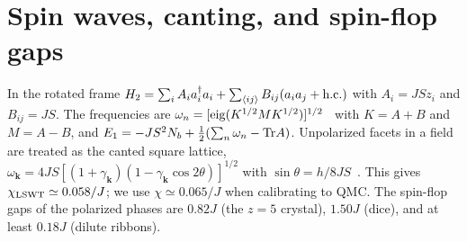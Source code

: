 \documentclass[aps,prb,twocolumn,superscriptaddress,floatfix]{revtex4-2}
\begin{document}
\section{Spin waves, canting, and spin-flop gaps}\label{app:sw}
In the rotated frame $H_2=\sum_iA_ia_i^\dagger a_i+\sum_{\langle ij\rangle}B_{ij}(a_ia_j+{\rm h.c.})$ with $A_i=JSz_i$ and $B_{ij}=JS$. The frequencies are $\omega_n=[{\rm eig}(K^{1/2}MK^{1/2})]^{1/2}$~\cite{Colpa1978} with $K=A+B$ and $M=A-B$, and $E_1=-JS^2N_b+\frac12(\sum_n\omega_n-{\rm Tr}A)$. Unpolarized facets in a field are treated as the canted square lattice, $\omega_{\mathbf k}=4JS[(1+\gamma_{\mathbf k})(1-\gamma_{\mathbf k}\cos2\theta)]^{1/2}$ with $\sin\theta=h/8JS$~\cite{Zhitomirsky1999}. This gives $\chi_{\rm LSWT}\simeq0.058/J$; we use $\chi\simeq0.065/J$ when calibrating to QMC. The spin-flop gaps of the polarized phases are $0.82J$ (the $z=5$ crystal), $1.50J$ (dice), and at least $0.18J$ (dilute ribbons).
\end{document}
